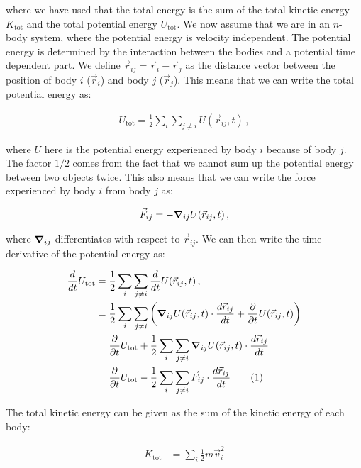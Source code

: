\documentclass[reprint,english,notitlepage]{revtex4-1}  %
\newcommand\numberthis{\addtocounter{equation}{1}\tag{\theequation}}
\begin{document}
where we have used that the total energy is the sum of the total kinetic energy $K_\text{tot}$ and the total potential energy $U_\text{tot}$. We now assume that we are in an $n$-body system, where the potential energy is velocity independent. The potential energy is determined by the interaction between the bodies and a potential time dependent part. We define $\vec{r}_{ij} = \vec{r}_i - \vec{r}_j$ as the distance vector between the position of body $i$ ($\vec{r}_i$) and body $j$ ($\vec{r}_j$). This means that we can write the total potential energy as:

\begin{align*}
U_\text{tot} = \frac{1}{2}\sum\limits_i \sum\limits_{j\neq i} U(\vec{r}_{ij},t) \, ,
\end{align*}

where $U$ here is the potential energy experienced by body $i$ because of body $j$. The factor $1/2$ comes from the fact that we cannot sum up the potential energy between two objects twice. This also means that we can write the force experienced by body $i$ from body $j$ as:

\begin{align*}
\vec{F}_{ij} = - \gradient_{ij} U(\vec{r}_{ij}, t) \, ,
\end{align*}

where $\gradient_{ij}$ differentiates with respect to $\vec{r}_{ij}$. We can then write the time derivative of the potential energy as:

\begin{align*}
\frac{d}{dt}U_\text{tot} &= \frac{1}{2}\sum\limits_{i} \sum\limits_{j\neq i} \frac{d}{dt} U (\vec{r}_{ij}, t ) \, , \\
&= \frac{1}{2}\sum\limits_{i} \sum\limits_{j\neq i} \bigg( \gradient_{ij} U (\vec{r}_{ij}, t ) \cdot \frac{d\vec{r}_{ij}}{dt} + \frac{\partial }{\partial t} U(\vec{r}_{ij}, t) \bigg) \\
&= \frac{\partial}{\partial t} U_\text{tot} + \frac{1}{2}\sum\limits_{i} \sum\limits_{j\neq i} \gradient_{ij} U (\vec{r}_{ij}, t ) \cdot \frac{d\vec{r}_{ij}}{dt} \\
&= \frac{\partial}{\partial t} U_\text{tot} - \frac{1}{2}\sum\limits_{i} \sum\limits_{j\neq i} \vec{F}_{ij} \cdot \frac{d\vec{r}_{ij}}{dt} \numberthis \label{eq:pot_en_der}
\end{align*}

The total kinetic energy can be given as the sum of the kinetic energy of each body:

\begin{align*}
K_\text{tot} &= \sum\limits_i \frac{1}{2} m \vec{v}_i^2
\end{align*}
\end{document}
